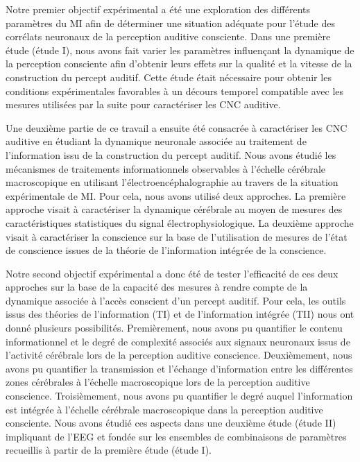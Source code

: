 Notre premier objectif expérimental a été une exploration des différents paramètres du MI afin de déterminer une situation adéquate pour l'étude des corrélats neuronaux de la perception auditive consciente. 
Dans une première étude (étude I), nous avons fait varier les paramètres influençant la dynamique de la perception consciente afin d'obtenir leurs effets sur la qualité et la vitesse de la construction du percept auditif.
Cette étude était nécessaire pour obtenir les conditions expérimentales favorables à un décours temporel compatible avec les mesures utilisées par la suite pour caractériser les CNC auditive.

Une deuxième partie de ce travail a ensuite été consacrée à caractériser les CNC auditive en étudiant la dynamique neuronale associée au traitement de l'information issu de la construction du percept auditif. 
Nous avons étudié les mécanismes de traitements informationnels observables à l'échelle cérébrale macroscopique en utilisant l'électroencéphalographie au travers de la situation expérimentale de MI. 
Pour cela, nous avons utilisé deux approches. 
La première approche visait à caractériser la dynamique cérébrale au moyen de mesures des caractéristiques statistiques du signal électrophysiologique. 
La deuxième approche visait à caractériser la conscience sur la base de l'utilisation de mesures de l'état de conscience issues de la théorie de l'information intégrée de la conscience. 

Notre second objectif expérimental a donc été de tester l'efficacité de ces deux approches sur la base de la capacité des mesures à rendre compte de la dynamique associée à l'accès conscient d'un percept auditif. 
Pour cela, les outils issus des théories de l'information (TI) et de l'information intégrée (TII) nous ont donné plusieurs possibilités. 
Premièrement, nous avons pu quantifier le contenu informationnel et le degré de complexité associés aux signaux neuronaux issus de l'activité cérébrale lors de la perception auditive conscience. 
Deuxièmement, nous avons pu quantifier la transmission et l'échange d'information entre les différentes zones cérébrales à l'échelle macroscopique lors de la perception auditive conscience. 
Troisièmement, nous avons pu quantifier le degré auquel l'information est intégrée à l'échelle cérébrale macroscopique dans la perception auditive consciente. 
Nous avons étudié ces aspects dans une deuxième étude (étude II) impliquant de l'EEG et fondée sur les ensembles de combinaisons de paramètres recueillis à partir de la première étude (étude I). 

